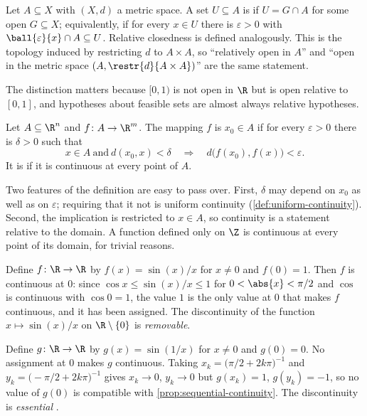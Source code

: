 \begin{definition}\label{def:relative-topology}
	Let $A\subseteq X$ with $(X,d)$ a metric space. A set $U\subseteq A$ is
	 if $U=G\cap A$ for some open
	$G\subseteq X$; equivalently, if for every $x\in U$ there is $\varepsilon>0$
	with $\ball{\varepsilon}{x}\cap A\subseteq U$. Relative closedness is defined
	analogously. This is the topology induced by restricting $d$ to
	$A\times A$, so ``relatively open in $A$'' and ``open in the metric space
	$(A,\restr{d}{A\times A})$'' are the same statement.
\end{definition}

The distinction matters because $[0,1)$ is not open in $\R$ but is open relative
to $[0,1]$, and hypotheses about feasible sets are almost always relative
hypotheses.

\begin{definition}[Continuity]\label{def:continuity}
	Let $A\subseteq\R^n$ and $f\colon A\to\R^m$. The mapping $f$ is
	 $x_0\in A$ if for every $\varepsilon>0$ there
	is $\delta>0$ such that
	\[
		x\in A\ \text{and}\ d(x_0,x)<\delta
		\quad\Longrightarrow\quad
		d\bigl(f(x_0),f(x)\bigr)<\varepsilon .
	\]
	It is  if it is continuous at every
	point of $A$.
\end{definition}

Two features of the definition are easy to pass over. First, $\delta$ may depend
on $x_0$ as well as on $\varepsilon$; requiring that it not is uniform
continuity (\autoref{def:uniform-continuity}). Second, the implication is
restricted to $x\in A$, so continuity is a statement relative to the domain. A
function defined only on $\Z$ is continuous at every point of its domain, for
trivial reasons.

\begin{eg}\label{eg:sinx-over-x}
	Define $f\colon\R\to\R$ by $f(x)=\sin(x)/x$ for $x\neq0$ and $f(0)=1$. Then $f$
	is continuous at $0$: since $\cos x\leq\sin(x)/x\leq1$ for $0<\abs{x}<\pi/2$ and
	$\cos$ is continuous with $\cos0=1$, the value $1$ is the only value at $0$ that
	makes $f$ continuous, and it has been assigned. The discontinuity of the
	function $x\mapsto\sin(x)/x$ on $\R\setminus\{0\}$ is \emph{removable}.

	Define $g\colon\R\to\R$ by $g(x)=\sin(1/x)$ for $x\neq0$ and $g(0)=0$. No
	assignment at $0$ makes $g$ continuous. Taking $x_k=\bigl(\pi/2+2k\pi\bigr)^{-1}$
	and $y_k=\bigl(-\pi/2+2k\pi\bigr)^{-1}$ gives $x_k\to0$, $y_k\to0$ but
	$g(x_k)=1$, $g(y_k)=-1$, so no value of $g(0)$ is compatible with
	\autoref{prop:sequential-continuity}. The discontinuity is \emph{essential}
	\autocite[slides 50--51]{fukuda2026analysis}.
\end{eg}

